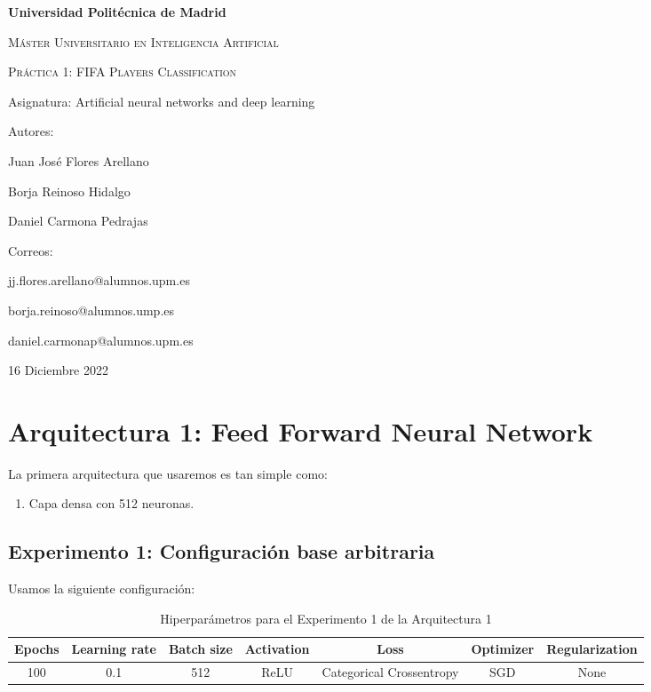 \documentclass{article}
\begin{document}

\begin{titlepage}
	\centering
	{\bfseries\LARGE Universidad Polit\'ecnica de Madrid \par}
	\vspace{1cm}
	{\scshape\Large M\'aster Universitario en Inteligencia Artificial \par}
	\vspace{3cm}
	{\scshape\Huge Pr\'actica 1: FIFA Players Classification \par}
	\vspace{3cm}
	{\Large Asignatura: Artificial neural networks and deep learning \par}
	\vfill
	{\Large Autores: \par}
	{\Large Juan José Flores Arellano \par
	 		Borja Reinoso Hidalgo \par 
	 		Daniel Carmona Pedrajas \par}
	\vfill
	{\Large Correos: \par}
	{\Large jj.flores.arellano@alumnos.upm.es \par
			borja.reinoso@alumnos.ump.es \par 
	 		daniel.carmonap@alumnos.upm.es \par}	
	\vfill
	{\Large 16 Diciembre 2022 \par}
\end{titlepage}

\tableofcontents

	\section{Arquitectura 1: Feed Forward Neural Network}
	\label{d-s-a1}
		La primera arquitectura que usaremos es tan simple como:
		\begin{enumerate}
			\item Capa densa con 512 neuronas.
		\end{enumerate}
		\subsection{Experimento 1: Configuraci\'on base arbitraria}
		\label{d-s-a1-e1}
			Usamos la siguiente configuraci\'on:
			\begin{table}[!h]
				\begin{center}
					\begin{tabular}{| c | c | c | c | c | c | c |}
						\textbf{Epochs} & \textbf{Learning rate} & \textbf{Batch size} & \textbf{Activation} & \textbf{Loss} & \textbf{Optimizer} & \textbf{Regularization} \\ \hline
						100 & 0.1 & 512 & ReLU & Categorical Crossentropy & SGD & None
					\end{tabular}
					\caption{Hiperpar\'ametros para el Experimento 1 de la Arquitectura 1}
					\label{tab:hip-d-a1-e1}
				\end{center}
			\end{table}
		
\end{document}
